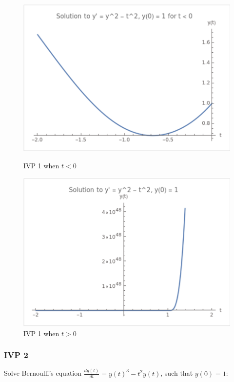 \documentclass{article}
\begin{document}
\begin{figure}[htbp]
    \centering
    \begin{minipage}[b]{0.45\textwidth}
        \centering
        \includegraphics[width=\textwidth]{pic学长/图片1.png}
        \caption{IVP 1 when $t < 0$}
        \label{fig:image1}
    \end{minipage}
    \hspace{0.05\textwidth}
    \begin{minipage}[b]{0.45\textwidth}
        \centering
        \includegraphics[width=\textwidth]{pic学长/图片2.png}
        \caption{IVP 1 when $t > 0$}
        \label{fig:image2}
    \end{minipage}
\end{figure}
\subsubsection{IVP 2}
Solve Bernoulli's equation \(\frac{dy(t)}{dt} = y(t)^3 - t^2 y(t)\), such that \(y(0) = 1\):
\end{document}
